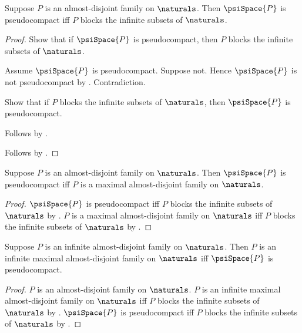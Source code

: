 \begin{theorem}\label{psi_space_pseudocompact_iff_blocking}
    Suppose $P$ is an almost-disjoint family on $\naturals$.
    Then $\psiSpace{P}$ is pseudocompact iff
        $P$ blocks the infinite subsets of $\naturals$.
\end{theorem}
\begin{proof}
    Show that if $\psiSpace{P}$ is pseudocompact, then
        $P$ blocks the infinite subsets of $\naturals$.
    \begin{subproof}
        Assume $\psiSpace{P}$ is pseudocompact.
        Suppose not.
        Hence $\psiSpace{P}$ is not pseudocompact by
            .
        Contradiction.
    \end{subproof}
    Show that if $P$ blocks the infinite subsets of $\naturals$, then
        $\psiSpace{P}$ is pseudocompact.
    \begin{subproof}
        Follows by .
    \end{subproof}
    Follows by \auto.
\end{proof}

\begin{theorem}\label{psi_space_pseudocompact_iff_maximal_family}
    Suppose $P$ is an almost-disjoint family on $\naturals$.
    Then $\psiSpace{P}$ is pseudocompact iff
        $P$ is a maximal almost-disjoint family on $\naturals$.
\end{theorem}
\begin{proof}
    $\psiSpace{P}$ is pseudocompact iff
        $P$ blocks the infinite subsets of $\naturals$ by
        .
    $P$ is a maximal almost-disjoint family on $\naturals$ iff
        $P$ blocks the infinite subsets of $\naturals$ by
        .
\end{proof}

\begin{theorem}\label{psi_space_pseudocompact_iff_infinite_maximal_family}
    Suppose $P$ is an infinite almost-disjoint family on $\naturals$.
    Then $P$ is an infinite maximal almost-disjoint family on $\naturals$ iff
        $\psiSpace{P}$ is pseudocompact.
\end{theorem}
\begin{proof}
    $P$ is an almost-disjoint family on $\naturals$.
    $P$ is an infinite maximal almost-disjoint family on $\naturals$ iff
        $P$ blocks the infinite subsets of $\naturals$ by
        .
    $\psiSpace{P}$ is pseudocompact iff
        $P$ blocks the infinite subsets of $\naturals$ by
        .
\end{proof}

